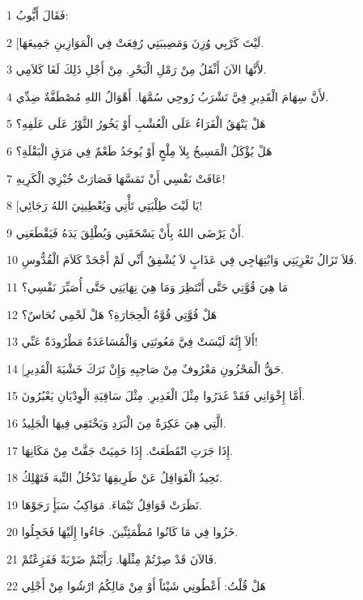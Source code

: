 \par 1 فَقَالَ أَيُّوبُ:
\par 2 [لَيْتَ كَرْبِي وُزِنَ وَمَصِيبَتِي رُفِعَتْ فِي الْمَوَازِينِ جَمِيعَهَا.
\par 3 لأَنَّهَا الآنَ أَثْقَلُ مِنْ رَمْلِ الْبَحْرِ. مِنْ أَجْلِ ذَلِكَ لَغَا كَلاَمِي.
\par 4 لأَنَّ سِهَامَ الْقَدِيرِ فِيَّ تَشْرَبُ رُوحِي سُمَّهَا. أَهْوَالُ اللهِ مُصْطَفَّةٌ ضِدِّي.
\par 5 هَلْ يَنْهَقُ الْفَرَاءُ عَلَى الْعُشْبِ أَوْ يَخُورُ الثَّوْرُ عَلَى عَلَفِهِ؟
\par 6 هَلْ يُؤْكَلُ الْمَسِيخُ بِلاَ مِلْحٍ أَوْ يُوجَدُ طَعْمٌ فِي مَرَقِ الْبَقْلَةِ؟
\par 7 عَافَتْ نَفْسِي أَنْ تَمَسَّهَا فَصَارَتْ خُبْزِيَ الْكَرِيهِ!
\par 8 [يَا لَيْتَ طِلْبَتِي تَأْتِي وَيُعْطِينِيَ اللهُ رَجَائِي!
\par 9 أَنْ يَرْضَى اللهُ بِأَنْ يَسْحَقَنِي وَيُطْلِقَ يَدَهُ فَيَقْطَعَنِي.
\par 10 فَلاَ تَزَالُ تَعْزِيَتِي وَابْتِهَاجِي فِي عَذَابٍ لاَ يُشْفِقُ أَنِّي لَمْ أَجْحَدْ كَلاَمَ الْقُدُّوسِ.
\par 11 مَا هِيَ قُوَّتِي حَتَّى أَنْتَظِرَ وَمَا هِيَ نِهَايَتِي حَتَّى أُصَبِّرَ نَفْسِي؟
\par 12 هَلْ قُوَّتِي قُوَّةُ الْحِجَارَةِ؟ هَلْ لَحْمِي نُحَاسٌ؟
\par 13 أَلاَ إِنَّهُ لَيْسَتْ فِيَّ مَعُونَتِي وَالْمُسَاعَدَةُ مَطْرُودَةٌ عَنِّي!
\par 14 [حَقُّ الْمَحْزُونِ مَعْرُوفٌ مِنْ صَاحِبِهِ وَإِنْ تَرَكَ خَشْيَةَ الْقَدِيرِ.
\par 15 أَمَّا إِخْوَانِي فَقَدْ غَدَرُوا مِثْلَ الْغَدِيرِ. مِثْلَ سَاقِيَةِ الْوِدْيَانِ يَعْبُرُونَ.
\par 16 الَّتِي هِيَ عَكِرَةٌ مِنَ الْبَرَدِ وَيَخْتَفِي فِيهَا الْجَلِيدُ.
\par 17 إِذَا جَرَتِ انْقَطَعَتْ. إِذَا حَمِيَتْ جَفَّتْ مِنْ مَكَانِهَا.
\par 18 تَحِيدُ الْقَوَافِلُ عَنْ طَرِيقِهَا تَدْخُلُ التِّيهَ فَتَهْلِكُ.
\par 19 نَظَرَتْ قَوَافِلُ تَيْمَاءَ. مَوَاكِبُ سَبَأٍ رَجَوْهَا.
\par 20 خَزُوا فِي مَا كَانُوا مُطْمَئِنِّينَ. جَاءُوا إِلَيْهَا فَخَجِلُوا.
\par 21 فَالآنَ قَدْ صِرْتُمْ مِثْلَهَا. رَأَيْتُمْ ضَرْبَةً فَفَزِعْتُمْ.
\par 22 هَلْ قُلْتُ: أَعْطُونِي شَيْئاً أَوْ مِنْ مَالِكُمُ ارْشُوا مِنْ أَجْلِي
